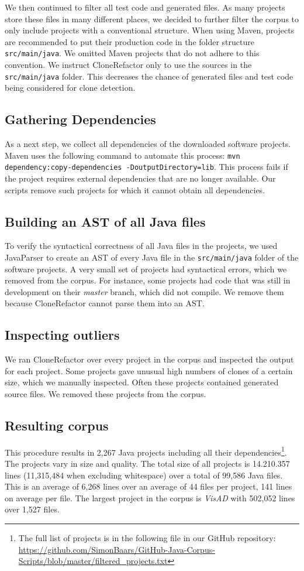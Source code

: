 We then continued to filter all test code and generated files. As many projects store these files in many different places, we decided to further filter the corpus to only include projects with a conventional structure. When using Maven, projects are recommended to put their production code in the folder structure \texttt{src/main/java}. We omitted Maven projects that do not adhere to this convention. We instruct CloneRefactor only to use the sources in the \texttt{src/main/java} folder. This decreases the chance of generated files and test code being considered for clone detection.

\subsection{Gathering Dependencies}
As a next step, we collect all dependencies of the downloaded software projects. Maven uses the following command to automate this process: \texttt{mvn dependency:copy-dependencies -DoutputDirectory=lib}. This process fails if the project requires external dependencies that are no longer available. Our scripts remove such projects for which it cannot obtain all dependencies.

\subsection{Building an AST of all Java files}
To verify the syntactical correctness of all Java files in the projects, we used JavaParser \cite{tomassetti2017javaparser} to create an AST of every Java file in the \texttt{src/main/java} folder of the software projects. A very small set of projects had syntactical errors, which we removed from the corpus. For instance, some projects had code that was still in development on their \textit{master} branch, which did not compile. We remove them because CloneRefactor cannot parse them into an AST.

\subsection{Inspecting outliers}
We ran CloneRefactor over every project in the corpus and inspected the output for each project. Some projects gave unusual high numbers of clones of a certain size, which we manually inspected. Often these projects contained generated source files. We removed these projects from the corpus.

\subsection{Resulting corpus}
This procedure results in 2,267 Java projects including all their dependencies\footnote{The full list of projects is in the following file in our GitHub repository: \url{https://github.com/SimonBaars/GitHub-Java-Corpus-Scripts/blob/master/filtered_projects.txt}}. The projects vary in size and quality. The total size of all projects is 14.210.357 lines (11,315,484 when excluding whitespace) over a total of 99,586 Java files. This is an average of 6,268 lines over an average of 44 files per project, 141 lines on average per file. The largest project in the corpus is \textit{VisAD} with 502,052 lines over 1,527 files.

